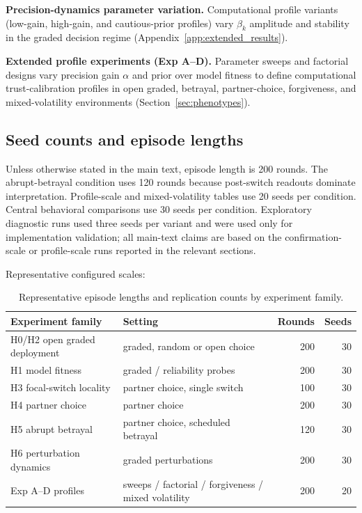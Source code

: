 \textbf{Precision-dynamics parameter variation.} Computational profile variants (low-gain, high-gain, and cautious-prior profiles) vary $\beta_k$ amplitude and stability in the graded decision regime (Appendix~\ref{app:extended_results}).

\textbf{Extended profile experiments (Exp A--D).} Parameter sweeps and factorial designs vary precision gain $\alpha$ and prior over model fitness to define computational trust-calibration profiles in open graded, betrayal, partner-choice, forgiveness, and mixed-volatility environments (Section~\ref{sec:phenotypes}).

\subsection{Seed counts and episode lengths}

Unless otherwise stated in the main text, episode length is 200 rounds. The abrupt-betrayal condition uses 120 rounds because post-switch readouts dominate interpretation. Profile-scale and mixed-volatility tables use 20 seeds per condition. Central behavioral comparisons use 30 seeds per condition. Exploratory diagnostic runs used three seeds per variant and were used only for implementation validation; all main-text claims are based on the confirmation-scale or profile-scale runs reported in the relevant sections.

Representative configured scales:

\begin{table}[H]
\centering
\caption{Representative episode lengths and replication counts by experiment family.}
\label{tab:protocol_scales}
\begin{tabular}{llrr}
\toprule
Experiment family & Setting & Rounds & Seeds \\
\midrule
H0/H2 open graded deployment & graded, random or open choice & 200 & 30 \\
H1 model fitness & graded / reliability probes & 200 & 30 \\
H3 focal-switch locality & partner choice, single switch & 100 & 30 \\
H4 partner choice & partner choice & 200 & 30 \\
H5 abrupt betrayal & partner choice, scheduled betrayal & 120 & 30 \\
H6 perturbation dynamics & graded perturbations & 200 & 30 \\
Exp A--D profiles & sweeps / factorial / forgiveness / mixed volatility & 200 & 20 \\
\bottomrule
\end{tabular}
\end{table}

